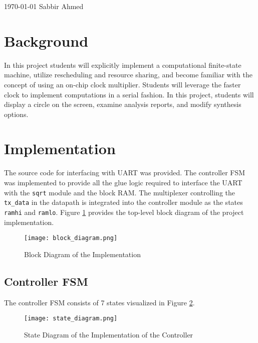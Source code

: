 \documentclass[paper=usletter, fontsize=12pt]{article}
\begin{document}
    {\today} {Sabbir Ahmed}
    \vspace{-0.1in}

    \section{Background} In this project students will explicitly implement a
    computational finite-state machine, utilize rescheduling and resource
    sharing, and become familiar with the concept of using an on-chip clock
    multiplier. Students will leverage the faster clock to implement
    computations in a serial fashion. In this project, students will display a
    circle on the screen, examine analysis reports, and modify synthesis
    options.

    \section{Implementation} The source code for interfacing with UART was
    provided. The controller FSM was implemented to provide all the glue logic
    required to interface the UART with the \texttt{sqrt} module and the block
    RAM. The multiplexer controlling the \texttt{tx\_data} in the datapath is
    integrated into the controller module as the states \texttt{ramhi} and
    \texttt{ramlo}. Figure \ref{fig:block} provides the top-level block diagram
    of the project implementation.

        \begin{figure}[ht]
            \begin{center}
                \texttt{[image: block\_diagram.png]}
                \caption{Block Diagram of the Implementation}
                \label{fig:block}
            \end{center}
        \end{figure}

        \subsection{Controller FSM} The controller FSM consists of 7 states
        visualized in Figure \ref{fig:states}.

            \begin{figure}[ht]
                \begin{center}
                    \texttt{[image: state\_diagram.png]}
                    \caption{State Diagram of the Implementation of the
                    Controller}
                    \label{fig:states}
                \end{center}
            \end{figure}
\end{document}
